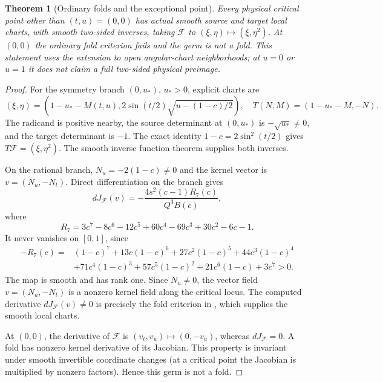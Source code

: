 \documentclass[11pt,a4paper]{article}
\newtheorem{theorem}{Theorem}[section]
\theoremstyle{definition}\newtheorem{definition}[theorem]{Definition}
\theoremstyle{remark}\newtheorem{remark}[theorem]{Remark}
\newcommand{\Map}{\mathcal F}\newcommand{\Pcore}{\mathcal P}
\begin{document}
\begin{theorem}[Ordinary folds and the exceptional point]\label{thm:fold}
Every physical critical point other than $(t,u)=(0,0)$ has actual smooth
source and target local charts, with smooth two-sided inverses, taking
$\Map$ to $(\xi,\eta)\mapsto(\xi,\eta^2)$.
At $(0,0)$ the ordinary fold criterion fails and the germ is not a fold.
This statement uses the extension to open angular-chart neighborhoods;
at $u=0$ or $u=1$ it does not claim a full two-sided physical preimage.
\end{theorem}
\begin{proof}
For the symmetry branch $(0,u_*)$, $u_*>0$, explicit charts are
\[
 (\xi,\eta)=\left(1-u_*-M(t,u),
        2\sin(t/2)\sqrt{u-(1-c)/2}\right),\quad
 T(N,M)=(1-u_*-M,-N).
\]
The radicand is positive nearby, the source determinant at $(0,u_*)$
is $-\sqrt{u_*}\ne0$, and the target determinant is $-1$.
The exact identity $1-c=2\sin^2(t/2)$ gives $T\Map=(\xi,\eta^2)$.
The smooth inverse function theorem supplies both inverses.

On the rational branch, $N_u=-2(1-c)\ne0$ and the kernel vector is
$v=(N_u,-N_t)$. Direct differentiation on the branch gives
\[
 dJ_{\Map}(v)=-\frac{4s^2(c-1)R_7(c)}{Q^3B(c)},
\]
where
\[
 R_7=3c^7-8c^6-12c^5+60c^4-69c^3+30c^2-6c-1.
\]
It never vanishes on $[0,1]$, since
\begin{align*}
 -R_7(c)={}&(1-c)^7+13c(1-c)^6+27c^2(1-c)^5
             +44c^3(1-c)^4\\
          &+71c^4(1-c)^3+57c^5(1-c)^2+21c^6(1-c)+3c^7>0.
\end{align*}
The map is smooth and has rank one. Since $N_u\ne0$, the vector field
$v=(N_u,-N_t)$ is a nonzero kernel field along the critical locus. The
computed derivative $dJ_{\Map}(v)\ne0$ is precisely the fold criterion
in \cite[Theorem 3.4(1)]{ishikawa}, which supplies the smooth local charts.

At $(0,0)$, the derivative of $\Map$ is $(v_t,v_u)\mapsto(0,-v_u)$,
whereas $dJ_{\Map}=0$. A fold has nonzero kernel derivative of its
Jacobian. This property is invariant under smooth invertible coordinate
changes (at a critical point the Jacobian is multiplied by nonzero
factors). Hence this germ is not a fold.
\end{proof}
\end{document}
